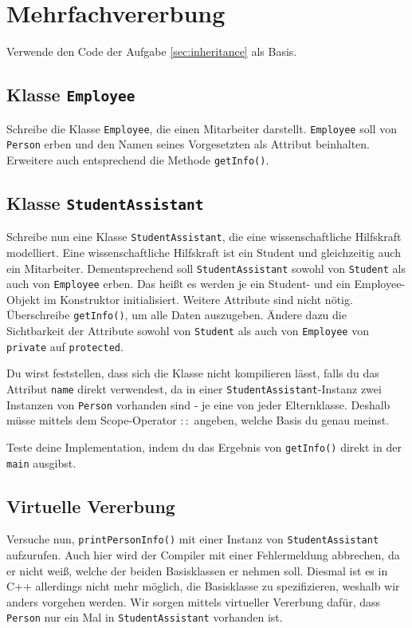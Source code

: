 \section{Mehrfachvererbung}
Verwende den Code der Aufgabe \ref{sec:inheritance} als Basis.

\subsection{Klasse \lstinline{Employee}}
Schreibe die Klasse \lstinline{Employee}, die einen Mitarbeiter darstellt.
\lstinline{Employee} soll von \lstinline{Person} erben und den Namen seines Vorgesetzten als Attribut beinhalten.
Erweitere auch entsprechend die Methode \lstinline{getInfo()}.

\subsection{Klasse \lstinline{StudentAssistant}}
Schreibe nun eine Klasse \lstinline{StudentAssistant}, die eine wissenschaftliche Hilfskraft modelliert.
Eine wissenschaftliche Hilfskraft ist ein Student und gleichzeitig auch ein Mitarbeiter.
Dementsprechend soll \lstinline{StudentAssistant} sowohl von \lstinline{Student} als auch von \lstinline{Employee} erben. Das heißt es werden je ein Student- und ein Employee-Objekt im Konstruktor initialisiert.
Weitere Attribute sind nicht nötig.
Überschreibe \lstinline{getInfo()}, um alle Daten auszugeben.
Ändere dazu die Sichtbarkeit der Attribute sowohl von \lstinline{Student} als auch von \lstinline{Employee} von \lstinline{private} auf \lstinline{protected}.

Du wirst feststellen, dass sich die Klasse nicht kompilieren lässt, falls du das Attribut \lstinline{name} direkt verwendest, da in einer \lstinline{StudentAssistant}-Instanz zwei Instanzen von \lstinline{Person} vorhanden sind - je eine von jeder Elternklasse. Deshalb müsse mittels dem Scope-Operator $::$ angeben, welche Basis du genau meinst.



Teste deine Implementation, indem du das Ergebnis von \lstinline{getInfo()} direkt in der \lstinline{main} ausgibst.

\subsection{Virtuelle Vererbung}
Versuche nun, \lstinline{printPersonInfo()} mit einer Instanz von \lstinline{StudentAssistant} aufzurufen. Auch hier wird der Compiler mit einer Fehlermeldung abbrechen, da er nicht weiß, welche der beiden Basisklassen er nehmen soll.
Diesmal ist es in C++ allerdings nicht mehr möglich, die Basisklasse zu spezifizieren, weshalb wir anders vorgehen werden.
Wir sorgen mittels virtueller Vererbung dafür, dass \lstinline{Person} nur ein Mal in \lstinline{StudentAssistant} vorhanden ist.

